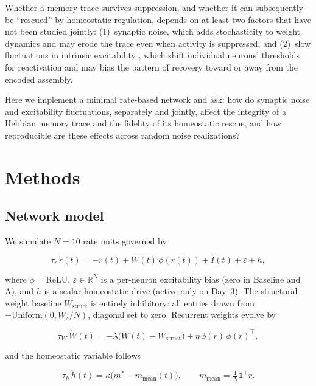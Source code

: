 \documentclass[11pt,a4paper]{article}
\begin{document}
Whether a memory trace survives suppression, and whether it can subsequently be
``rescued'' by homeostatic regulation, depends on at least two factors that have
not been studied jointly: (1)~synaptic noise, which adds stochasticity to weight
dynamics and may erode the trace even when activity is suppressed; and (2)~slow
fluctuations in intrinsic excitability \citep{Delamare2023}, which shift
individual neurons' thresholds for reactivation and may bias the pattern of
recovery toward or away from the encoded assembly.

Here we implement a minimal rate-based network and ask: how do synaptic noise
and excitability fluctuations, separately and jointly, affect the integrity of a
Hebbian memory trace and the fidelity of its homeostatic rescue, and how
reproducible are these effects across random noise realizations?

\section{Methods}

\subsection{Network model}

We simulate $N = 10$ rate units governed by

\begin{equation}
\tau_r\,\dot{r}(t) = -r(t) + W(t)\,\phi(r(t)) + I(t) + \varepsilon + h,
\label{eq:rate}
\end{equation}

where $\phi = \mathrm{ReLU}$, $\varepsilon\in\mathbb{R}^N$ is a per-neuron
excitability bias (zero in Baseline and A), and $h$ is a scalar homeostatic
drive (active only on Day~3).  The structural weight baseline
$W_\mathrm{struct}$ is entirely inhibitory: all entries drawn from
$-\mathrm{Uniform}(0,W_s/N)$, diagonal set to zero.  Recurrent weights evolve by

\begin{equation}
\tau_W\,\dot{W}(t) = -\lambda\bigl(W(t) - W_\mathrm{struct}\bigr)
                    + \eta\,\phi(r)\,\phi(r)^\top,
\label{eq:weights}
\end{equation}

and the homeostatic variable follows

\begin{equation}
\tau_h\,\dot{h}(t) = \kappa\bigl(m^* - m_\mathrm{mean}(t)\bigr),
\qquad m_\mathrm{mean} = \tfrac{1}{N}\mathbf{1}^\top r.
\label{eq:homeo}
\end{equation}
\end{document}

